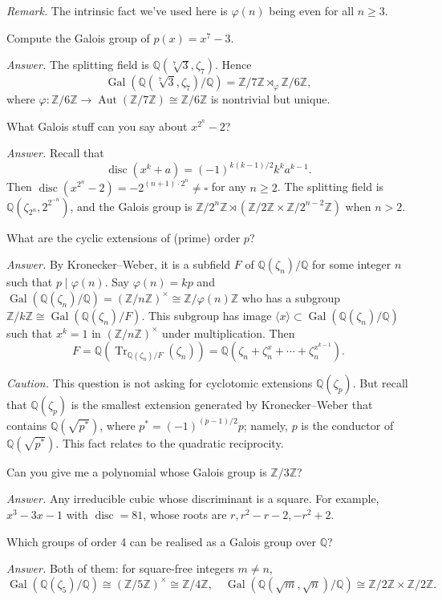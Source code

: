\documentclass{mathproblems}
\newcommand\Q{\mathbb{Q}}
\newcommand\Z{\mathbb{Z}}
\DeclareMathOperator{\Gal}{Gal}
\begin{document}
\begin{questions}
\textit{Remark.} The intrinsic fact we've used here is $\varphi(n)$ being even for all $n\geqslant 3$.

\miquestion
{\color{blue} Compute the Galois group of $p(x)=x^{7}-3$.}

\textit{Answer.}
The splitting field is $\Q(\sqrt[7]{3},\zeta_7)$. Hence
$$
\Gal(\Q(\sqrt[7]{3},\zeta_7)/\Q)=\Z/7\Z \rtimes_{\varphi} \Z/6\Z,
$$
where $\varphi: \Z/6\Z \to \operatorname{Aut}(\Z/7\Z)\cong \Z/6\Z$ is nontrivial but unique.

\miquestion
{\color{blue} What Galois stuff can you say about $x^{2^{n}}-2$?}

\textit{Answer.}
Recall that
$$
\operatorname{disc}(x^k+a)=(-1)^{k(k-1)/2}k^k a^{k-1}.
$$
Then $\operatorname{disc}(x^{2^{n}}-2)=-2^{(n+1)\cdot 2^n}\neq \square$ for any $n\geqslant 2$. The splitting field is $\Q(\zeta_{2^n},2^{2^{-n}})$, and the Galois group is $\Z/2^{n}\Z\rtimes (\Z/2\Z\times \Z/2^{n-2}\Z)$ when $n>2$.

\miquestion
{\color{blue} What are the cyclic extensions of (prime) order $p$?}

\textit{Answer.} By Kronecker--Weber, it is a subfield $F$ of $\Q(\zeta_n)/\Q$ for some integer $n$ such that $p\mid \varphi(n)$. Say $\varphi(n)=kp$ and $\Gal(\Q(\zeta_n)/\Q)=(\Z/n\Z)^\times\cong \Z/\varphi(n)\Z$ who has a subgroup $\Z/k\Z\cong \Gal(\Q(\zeta_n)/F)$. This subgroup has image $\langle x \rangle\subset \Gal(\Q(\zeta_n)/\Q)$ such that $x^k=1$ in $(\Z/n\Z)^\times$ under multiplication. Then
$$
F=\Q(\operatorname{Tr}_{\Q(\zeta_n)/F}(\zeta_n))=\Q(\zeta_n+\zeta_n^x+\cdots +\zeta_n^{x^{k-1}}).
$$


\textit{Caution.} This question is not asking for cyclotomic extensions $\Q(\zeta_p)$. But recall that $\Q(\zeta_p)$ is the smallest extension generated by Kronecker--Weber that contains $\Q(\sqrt{p^*})$, where $p^*=(-1)^{(p-1)/2}p$; namely, $p$ is the conductor of $\Q(\sqrt{p^*})$. This fact relates to the quadratic reciprocity.

\miquestion
{\color{blue} Can you give me a polynomial whose Galois group is $\Z / 3 \Z$?}

\textit{Answer.} Any irreducible cubic whose discriminant is a square. For example, $x^3-3x-1$ with $\operatorname{disc}=81$, whose roots are $r, r^2-r-2, -r^2+2$.

\miquestion
{\color{blue} Which groups of order 4 can be realised as a Galois group over $\Q$?}

\textit{Answer.} Both of them: for square-free integers $m\neq n$,
$$
\Gal(\Q(\zeta_5)/\Q)\cong (\Z/5\Z)^\times \cong \Z/4\Z,\quad \Gal(\Q(\sqrt{m},\sqrt{n})/\Q)\cong \Z/2\Z\times \Z/2\Z.
$$


\end{questions}
\end{document}
